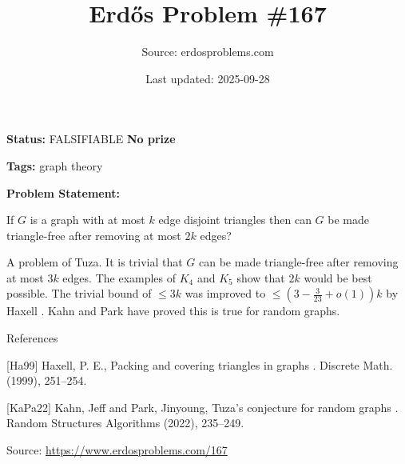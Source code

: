 \documentclass{article}
\title{Erd\H{o}s Problem \#167}
\date{Last updated: 2025-09-28}
\author{Source: erdosproblems.com}
\begin{document}
\maketitle

\noindent\textbf{Status:} FALSIFIABLE \quad \textbf{No prize}

\noindent\textbf{Tags:} graph theory

\medskip

\noindent\textbf{Problem Statement:}

If $G$ is a graph with at most $k$ edge disjoint triangles then can $G$ be made triangle-free after removing at most $2k$ edges?




A problem of Tuza. It is trivial that $G$ can be made triangle-free after removing at most $3k$ edges. The examples of $K_4$ and $K_5$ show that $2k$ would be best possible. The trivial bound of $\leq 3k$ was improved to $\leq (3-\frac{3}{23}+o(1))k$ by Haxell \cite{Ha99}. Kahn and Park \cite{KaPa22} have proved this is true for random graphs.




References

[Ha99] Haxell, P. E., Packing and covering triangles in graphs . Discrete Math. (1999), 251--254.

[KaPa22] Kahn, Jeff and Park, Jinyoung, Tuza's conjecture for random graphs . Random Structures Algorithms (2022), 235--249.

\bigskip
\noindent\small{Source: \url{https://www.erdosproblems.com/167}}
\end{document}
